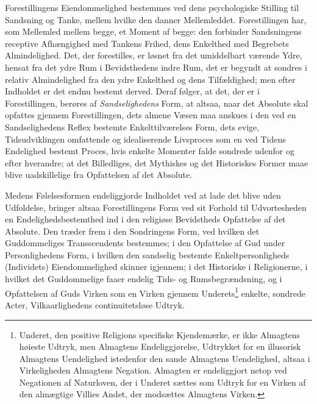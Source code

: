 \documentclass[12pt,a4paper]{book}
\newcommand{\opage}[1]{\marginnote{\footnotesize\textit{[#1]}}}
\begin{document}
Forestillingens Eiendommelighed bestemmes ved dens psychologiske Stilling til
Sandsning og Tanke, mellem hvilke den danner Mellemleddet. Forestillingen har,
som Mellem\opage{35}led mellem begge, et Moment af begge: den forbinder Sandsningens
receptive Afhængighed med Tankens Frihed, dens Enkelthed med Begrebets
Almindelighed. Det, der forestilles, er løsnet fra det umiddelbart værende Ydre,
hensat fra det ydre Rum i Bevidsthedens indre Rum, det er begyndt at sondres i
relativ Almindelighed fra den ydre Enkelthed og dens Tilfældighed; men efter
Indholdet er det endnu bestemt derved. Deraf følger, at det, der er i
Forestillingen, berøres af \emph{Sandselighedens} Form, at altsaa, naar det
Absolute skal opfattes gjennem Forestillingen, dets almene Væsen maa anskues i
den ved en Sandselighedens Reflex bestemte Enkelttilværelses Form, dets evige,
Tidsudviklingen omfattende og idealiserende Livsproces som en ved Tidens
Endelighed bestemt Proces, hvis enkelte Momenter falde sondrede udenfor og efter
hverandre; at det Billedliges, det Mythiskes og det Historiskes Former maae blive uadskillelige fra Opfattelsen af det Absolute.

Medens Følelsesformen endeliggjorde Indholdet ved at lade det blive uden
Udfoldelse, bringer altsaa Forestillingens Form ved sit Forhold til
Udvortesheden en Endelighedsbestemthed ind i den religiøse Bevidstheds
Opfattelse af det Absolute. Den træder frem i den Sondringens Form, ved hvilken
det Guddommeliges Transscendents bestemmes; i den Opfattelse af Gud under
Personlighedens Form, i hvilken den sandselig bestemte Enkeltpersonligheds
(Individets) Eiendommelighed skinner igjennem; i det Historiske i Religionerne, i
hvilket det Guddommelige faaer endelig Tids- og Rumsbegrændsning, og i
Opfattelsen af Guds Virken som en Virken gjennem Underets\footnote{Underet, den
positive Religions specifiske Kjendemærke, er ikke Almagtens høieste Udtryk, men
Almagtens Endeliggjørelse, Udtrykket for en illusorisk Almagtens Uendelighed
istedenfor den sande Almagtens Uendelighed, altsaa i Virkeligheden Almagtens
Negation. Almagten er endeliggjort netop ved Negationen af Naturloven, der i
Underet sættes som Udtryk for en Virken af den almægtige Villies Andet, der
modsættes Almagtens Virken.} enkelte, sondrede Acter, Vilkaarlighedens
continuitetsløse Udtryk.
\end{document}
